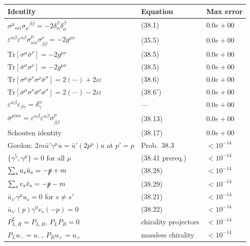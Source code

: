 \begin{center}
\renewcommand{\arraystretch}{1.5}
\begin{tabular}{@{}lll@{}}
  \toprule
  Identity & Equation & Max error \\
  \midrule
  $\sigma^\mu{}_{\alpha\dot\alpha}\sigma_\mu{}^{\beta\dot\beta}=-2\delta_\alpha^\beta\delta_{\dot\alpha}^{\dot\beta}$
    & (38.1) & $0.0e+00$ \\
  $\varepsilon^{\alpha\beta}\varepsilon^{\dot\alpha\dot\beta}\sigma^\mu_{\alpha\dot\alpha}\sigma^\nu_{\beta\dot\beta}=-2g^{\mu\nu}$
    & (35.5) & $0.0e+00$ \\
  $\mathrm{Tr}[\sigma^\mu\bar\sigma^\nu]=-2g^{\mu\nu}$
    & (38.5) & $0.0e+00$ \\
  $\mathrm{Tr}[\bar\sigma^\mu\sigma^\nu]=-2g^{\mu\nu}$
    & (38.5) & $0.0e+00$ \\
  $\mathrm{Tr}[\sigma^\mu\bar\sigma^\nu\sigma^\rho\bar\sigma^\sigma]=2(\cdots)+2i\varepsilon$
    & (38.6) & $0.0e+00$ \\
  $\mathrm{Tr}[\bar\sigma^\mu\sigma^\nu\bar\sigma^\rho\sigma^\sigma]=2(\cdots)-2i\varepsilon$
    & (38.6$'$) & $0.0e+00$ \\
  $\varepsilon^{\alpha\beta}\varepsilon_{\beta\gamma}=\delta^\alpha_\gamma$
    & --- & $0.0e+00$ \\
  $\bar\sigma^{\mu\dot\alpha\alpha}=\varepsilon^{\alpha\beta}\varepsilon^{\dot\alpha\dot\beta}\sigma^\mu_{\beta\dot\beta}$
    & (38.13) & $0.0e+00$ \\
  Schouten identity & (38.17) & $0.0e+00$ \\
  Gordon: $2m\bar u'\gamma^\mu u = \bar u'(2p^\mu)u$ at $p'=p$ & Prob.~38.3 & $<10^{-14}$ \\
  $\{\gamma^5,\gamma^\mu\}=0$ for all $\mu$ & (38.41 prereq.) & $<10^{-14}$ \\
  $\sum_s u_s\bar u_s = -\slashed{p}+m$ & (38.28) & $<10^{-14}$ \\
  $\sum_s v_s\bar v_s = -\slashed{p}-m$ & (38.29) & $<10^{-14}$ \\
  $\bar u_{s'}\gamma^\mu u_s = 0$ for $s\neq s'$ & (38.21) & $<10^{-14}$ \\
  $\bar u_{s'}(p)\gamma^0 v_s(-p)=0$ & (38.22) & $<10^{-14}$ \\
  $P_{L,R}^2=P_{L,R}$, $P_LP_R=0$ & chirality projectors & $<10^{-14}$ \\
  $P_Lu_- = u_-$, $P_Ru_+ = u_+$ & massless chirality & $<10^{-14}$ \\
  \bottomrule
\end{tabular}
\end{center}

